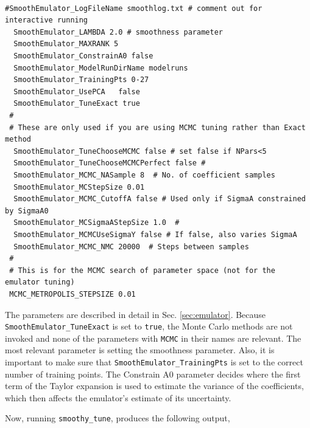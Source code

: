 \documentclass[UserManual.tex]{subfiles}
\begin{document}
{\tt
\begin{verbatim}
#SmoothEmulator_LogFileName smoothlog.txt # comment out for interactive running
  SmoothEmulator_LAMBDA 2.0 # smoothness parameter
  SmoothEmulator_MAXRANK 5
  SmoothEmulator_ConstrainA0 false
  SmoothEmulator_ModelRunDirName modelruns
  SmoothEmulator_TrainingPts 0-27
  SmoothEmulator_UsePCA   false
  SmoothEmulator_TuneExact true
 #
 # These are only used if you are using MCMC tuning rather than Exact method
  SmoothEmulator_TuneChooseMCMC false # set false if NPars<5
  SmoothEmulator_TuneChooseMCMCPerfect false #
  SmoothEmulator_MCMC_NASample 8  # No. of coefficient samples
  SmoothEmulator_MCStepSize 0.01
  SmoothEmulator_MCMC_CutoffA false # Used only if SigmaA constrained by SigmaA0
  SmoothEmulator_MCSigmaAStepSize 1.0  #
  SmoothEmulator_MCMCUseSigmaY false # If false, also varies SigmaA
  SmoothEmulator_MCMC_NMC 20000  # Steps between samples 
 #
 # This is for the MCMC search of parameter space (not for the emulator tuning)
 MCMC_METROPOLIS_STEPSIZE 0.01
\end{verbatim}
}
The parameters are described in detail in Sec. \ref{sec:emulator}. Because {\tt SmoothEmulator\_TuneExact} is set to {\tt true}, the Monte Carlo methods are not invoked and none of the parameters with {\tt MCMC} in their names are relevant. The most relevant parameter is setting the smoothness parameter. Also, it is important to make sure that {\tt SmoothEmulator\_TrainingPts} is set to the correct number of training points. The Constrain A0 parameter decides where the first term of the Taylor expansion is used to estimate the variance of the coefficients, which then affects the emulator's estimate of its uncertainty.

Now, running {\tt smoothy\_tune}, produces the following output,
\end{document}
